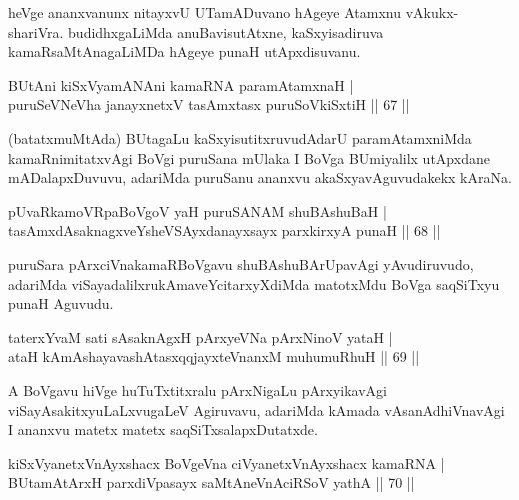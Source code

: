 \begin{artha}
heVge ananxvanunx nitayxvU UTamADuvano hAgeye Atamxnu vAkukx-shariVra. budidhxgaLiMda 
anuBavisutAtxne, kaSxyisadiruva kamaRsaMtAnagaLiMDa hAgeye punaH utApxdisuvanu.
\end{artha}


\begin{shl}
BUtAni kiSxVyamANAni kamaRNA paramAtamxnaH |\\
puruSeVNeVha janayxnetxV tasAmxtasx puruSoV\s kiSxtiH \hfill || 67 ||
\end{shl}

\begin{artha}
(batatxmuMtAda) BUtagaLu kaSxyisutitxruvudAdarU paramAtamxniMda kamaRnimitatxvAgi BoVgi puruSana mUlaka I BoVga BUmiyalilx utApxdane mADalapxDuvuvu, adariMda puruSanu ananxvu akaSxyavAguvudakekx kAraNa.
\end{artha}

\begin{shl}
pUvaRkamoVRpaBoVgoV yaH puruSANAM shuBAshuBaH |\\
tasAmxdAsaknagxveYsheVSAyxdanayxsayx \footnotemark{}parxkirxyA punaH \hfill || 68 ||
\end{shl}

\begin{artha}
puruSara pArxciVnakamaRBoVgavu shuBAshuBArUpavAgi yAvudiruvudo, adariMda viSayadalilxrukAmaveYcitarxyXdiMda matotxMdu BoVga saqSiTxyu punaH Aguvudu.
\end{artha}

\begin{shl}
taterxYvaM sati sAsaknAgxH pArxyeVNa pArxNinoV yataH |\\
ataH kAmAshayavashAtasxqqjayxteV\s nanxM muhumuRhuH \hfill || 69 ||
\end{shl}

\begin{artha}
A BoVgavu hiVge huTuTxtitxralu pArxNigaLu pArxyikavAgi viSayAsakitxyuLaLxvugaLeV Agiruvavu, adariMda kAmada vAsanAdhiVnavAgi I ananxvu matetx matetx saqSiTxsalapxDutatxde.
\end{artha}

\begin{shl}
kiSxVyanetxV\s nAyxshacx BoVgeVna ciVyanetxV\s nAyxshacx kamaRNA |\\
BUtamAtArxH parxdiVpasayx saMtAneVnAciRSoV yathA \hfill || 70 ||
\end{shl}

